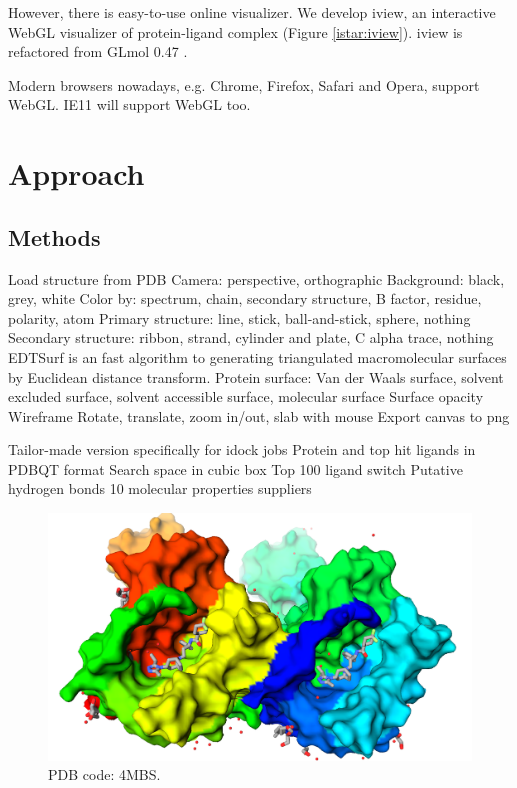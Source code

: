 \documentclass{bioinfo}
\begin{document}
However, there is easy-to-use online visualizer. We develop iview, an interactive WebGL visualizer of protein-ligand complex (Figure \ref{istar:iview}). iview is refactored from GLmol 0.47 \citep{1319}.

Modern browsers nowadays, e.g. Chrome, Firefox, Safari and Opera, support WebGL. IE11 will support WebGL too.

\section{Approach}

\begin{methods}
\section{Methods}

Load structure from PDB
Camera: perspective, orthographic
Background: black, grey, white
Color by: spectrum, chain, secondary structure, B factor, residue, polarity, atom
Primary structure: line, stick, ball-and-stick, sphere, nothing
Secondary structure: ribbon, strand, cylinder and plate, C alpha trace, nothing
EDTSurf \citep{1297} is an fast algorithm to generating triangulated macromolecular surfaces by Euclidean distance transform.
Protein surface: Van der Waals surface, solvent excluded surface, solvent accessible surface, molecular surface 
Surface opacity
Wireframe
Rotate, translate, zoom in/out, slab with mouse
Export canvas to png

Tailor-made version specifically for idock jobs
Protein and top hit ligands in PDBQT format
Search space in cubic box
Top 100 ligand switch
Putative hydrogen bonds
10 molecular properties
suppliers

\end{methods}

\begin{figure}[!tpb]
\centerline{\includegraphics{4MBS.png}}
\caption{PDB code: 4MBS.}\label{fig:4MBS}
\end{figure}
\end{document}
